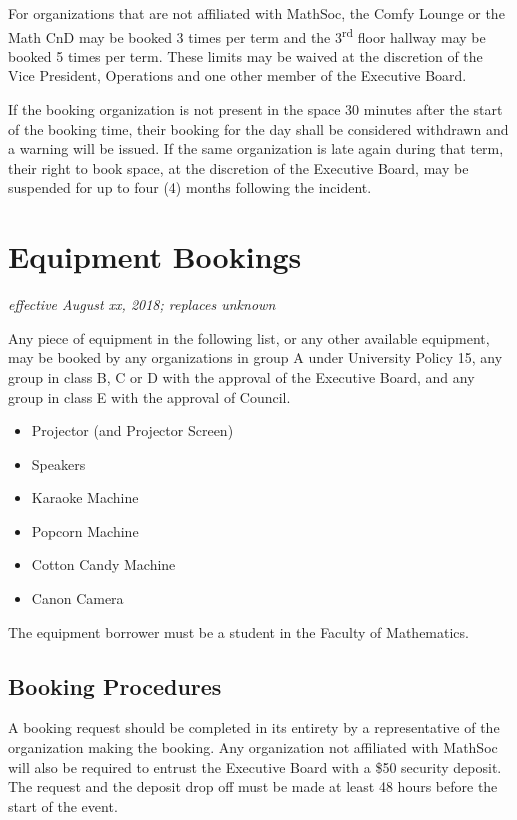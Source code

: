 For organizations that are not affiliated with MathSoc, the Comfy Lounge or the
Math CnD may be booked 3 times per term and the 3\textsuperscript{rd} floor
hallway may be booked 5 times per term. These limits may be waived at the
discretion of the Vice President, Operations and one other member of the
Executive Board.

If the booking organization is not present in the space 30 minutes after the
start of the booking time, their booking for the day shall be considered
withdrawn and a warning will be issued. If the same organization is late again
during that term, their right to book space, at the discretion of the Executive
Board, may be suspended for up to four (4) months following the incident.

\section{Equipment Bookings}
\emph{effective August xx, 2018; replaces unknown}

Any piece of equipment in the following list, or any other available equipment,
may be booked by any organizations in group A under University Policy 15, any
group in class B, C or D with the approval of the Executive Board, and any
group in class E with the approval of Council.

\begin{itemize}
  \item Projector (and Projector Screen)
  \item Speakers
  \item Karaoke Machine
  \item Popcorn Machine
  \item Cotton Candy Machine
  \item Canon Camera
\end{itemize}

The equipment borrower must be a student in the Faculty of Mathematics.

\subsection{Booking Procedures}

A booking request should be completed in its entirety by a
representative of the organization making the booking. Any organization not
affiliated with MathSoc will also be required to entrust the Executive Board
with a \$50 security deposit. The request and the deposit drop off must be made
at least 48 hours before the start of the event.

